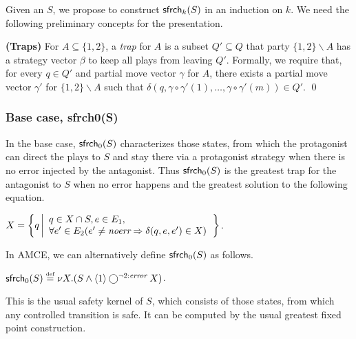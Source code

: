 Given an $S$, 
we propose to construct $\mathsf{sfrch}_k(S)$ in an induction on\label{induction.on.k} $k$.  
We need the following preliminary concepts for the presentation. 


\begin{definition} 
\textbf{(Traps)}
\label{def.traps}
For $A\subseteq \{1,2\}$,
a {\em trap} for $A$ is a subset $Q'\subseteq Q$ 
that party $\{1,2\}\smallsetminus A$ has a strategy vector $\beta$ 
to keep all plays from leaving $Q'$.  
Formally, we require that, for every $q\in Q'$ 
and partial move vector $\gamma$ for $A$, 
there exists a partial move vector $\gamma'$ for $\{1,2\}\smallsetminus A$ 
such that $\delta(q,\gamma\circ\gamma'(1),\ldots,\gamma\circ\gamma'(m))\in Q'$. 
\qed
\end{definition}

\subsubsection{Base case, sfrch0(S)}

In the base case, 
$\mathsf{sfrch}_0(S)$ characterizes those states, from which the protagonist 
can direct the plays to 
$S$\label{reply2.those.states.that.can.goto.S}   
 and 
stay there via a protagonist strategy when there is no error injected by 
the antagonist. 
Thus $\mathsf{sfrch}_0(S)$ is the greatest trap for the antagonist to $S$ when no error happens and 
the greatest solution to the following equation. 
\begin{center} 
\label{reply2.SPrime}
$X=\left\{q \left| \begin{array}{l}
	q\in X\cap S, e\in E_1, \\
	\forall e'\in E_2(e' \neq \textit{noerr}\Rightarrow \delta(q,e,e') \in X) 
	\end{array}\right.\right\}$. 
\end{center} 
In AMCE, we can alternatively define $\mathsf{sfrch}_0(S)$ as follows. 
\begin{center} 
\label{reply2.smallX}
$\mathsf{sfrch}_0(S)\stackrel{\mbox{\tiny def}}{=} \nu X.(S\wedge\langle 1\rangle \bigcirc^{\neg 2:\textit{\scriptsize error}} X)$.  
\end{center} 
This is the usual safety kernel of $S$, which consists of those states, from 
which any controlled transition is safe.  
It can be computed by the usual greatest fixed point construction.


